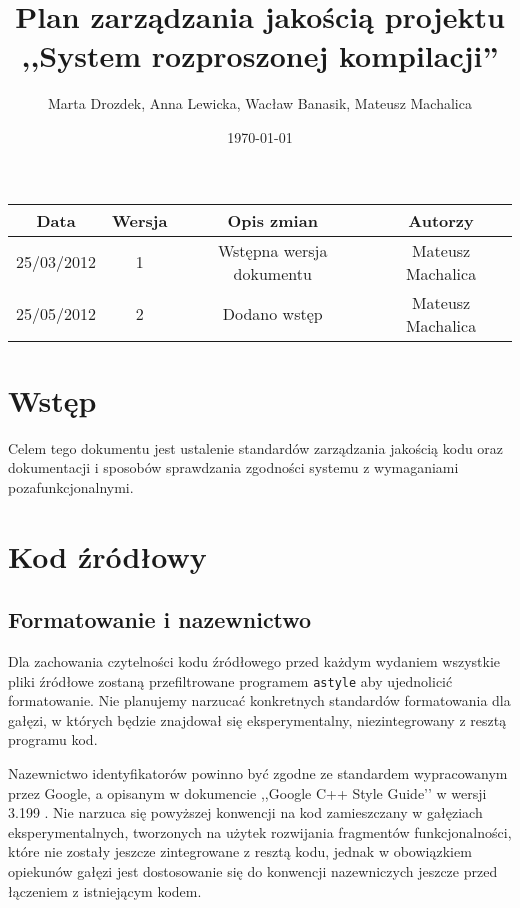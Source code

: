 \documentclass[a4paper]{article}
\title{Plan zarządzania jakością projektu ,,System rozproszonej kompilacji''}
\author{Marta Drozdek, Anna Lewicka, Wacław Banasik, Mateusz Machalica}
\date{\today}
\begin{document}
\maketitle

\begin{table}[!h]
	\centering
	\begin{tabular}{|c|c|c|c|}
		\hline
		\textbf{Data} & \textbf{Wersja} & \textbf{Opis zmian} & \textbf{Autorzy} \\ \hline
		25/03/2012 & 1 & Wstępna wersja dokumentu & Mateusz Machalica \\ \hline
		25/05/2012 & 2 & Dodano wstęp & Mateusz Machalica \\ \hline
	\end{tabular}
\end{table}

\section{Wstęp}

Celem tego dokumentu jest ustalenie standardów zarządzania jakością kodu oraz dokumentacji i sposobów sprawdzania zgodności systemu z wymaganiami pozafunkcjonalnymi.

\section{Kod źródłowy}

\subsection{Formatowanie i nazewnictwo}

Dla zachowania czytelności kodu źródłowego przed każdym wydaniem wszystkie pliki źródłowe zostaną przefiltrowane programem \verb+astyle+ aby ujednolicić formatowanie. Nie planujemy narzucać konkretnych standardów formatowania dla gałęzi, w których będzie znajdował się eksperymentalny, niezintegrowany z resztą programu kod.

Nazewnictwo identyfikatorów powinno być zgodne ze standardem wypracowanym przez Google, a opisanym w dokumencie ,,Google C++ Style Guide’’ w wersji 3.199 \cite{googstyle}.
Nie narzuca się powyższej konwencji na kod zamieszczany w gałęziach eksperymentalnych, tworzonych na użytek rozwijania fragmentów funkcjonalności, które nie zostały jeszcze zintegrowane z resztą kodu, jednak w obowiązkiem opiekunów gałęzi jest dostosowanie się do konwencji nazewniczych jeszcze przed łączeniem z istniejącym kodem.
\end{document}
